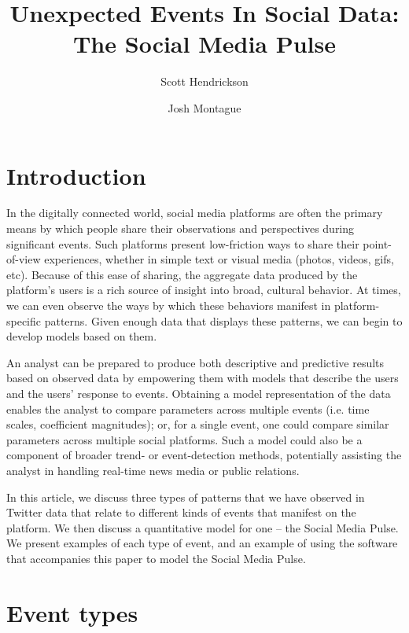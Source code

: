 \documentclass{article}
\title{Unexpected Events In Social Data: The Social Media Pulse}
\author[]{Scott Hendrickson}
\author[]{Josh Montague}
\affil[]{Twitter, Inc.}
\begin{document}
\maketitle

\section{Introduction}
\label{sec:intro}

In the digitally connected world, social media platforms are often the primary means by which people share their observations and perspectives during significant events. Such platforms present low-friction ways to share their point-of-view experiences, whether in simple text or visual media (photos, videos, gifs, etc). Because of this ease of sharing, the aggregate data produced by the platform's users is a rich source of insight into broad, cultural behavior. At times, we can even observe the ways by which these behaviors manifest in platform-specific patterns. Given enough data that displays these patterns, we can begin to develop models based on them.   

An analyst can be prepared to produce both descriptive and predictive results based on observed data by empowering them with models that describe the users and the users' response to events. Obtaining a model representation of the data enables the analyst to compare parameters across multiple events (i.e. time scales, coefficient magnitudes); or, for a single event, one could compare similar parameters across multiple social platforms. Such a model could also be a component of broader trend- or event-detection methods, potentially assisting the analyst in handling real-time news media or public relations. 

In this article, we discuss three types of patterns that we have observed in Twitter data that relate to different kinds of events that manifest on the platform. We then discuss a quantitative model for one -- the Social Media Pulse. We present examples of each type of event, and an example of using the software that accompanies this paper to model the Social Media Pulse.\cite{pulse}


\section{Event types}
\label{sec:models}
\end{document}
